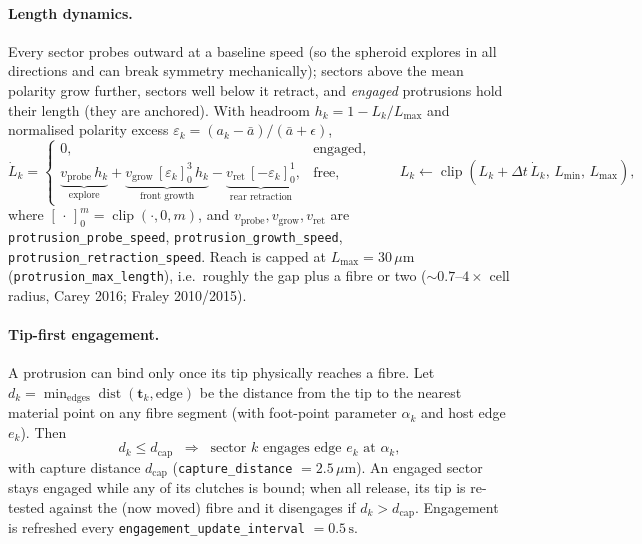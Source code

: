 \documentclass[11pt]{article}
\newcommand{\dt}{\Delta t}
\newcommand{\umt}{\mu\text{m}}            %
\newcommand{\um}{\,\umt}
\newcommand{\code}[1]{\texttt{\small #1}}
\begin{document}
\paragraph{Length dynamics.} Every sector probes outward at a baseline speed (so the spheroid
explores in all directions and can break symmetry mechanically); sectors above the mean polarity
grow further, sectors well below it retract, and \emph{engaged} protrusions hold their length
(they are anchored). With headroom $h_k = 1 - L_k/L_{\max}$ and normalised polarity excess
$\varepsilon_k = (a_k-\bar a)/(\bar a+\epsilon)$,
\begin{equation}
  \dot L_k =
  \begin{cases}
    0, & \text{engaged},\\[3pt]
    \underbrace{v_{\text{probe}}\,h_k}_{\text{explore}}
    + \underbrace{v_{\text{grow}}\,[\varepsilon_k]_0^{3}\,h_k}_{\text{front growth}}
    - \underbrace{v_{\text{ret}}\,[-\varepsilon_k]_0^{1}}_{\text{rear retraction}}, & \text{free},
  \end{cases}
  \qquad
  L_k \leftarrow \operatorname{clip}(L_k+\dt\,\dot L_k,\,L_{\min},\,L_{\max}),
  \label{eq:length}
\end{equation}
where $[\,\cdot\,]_0^{m}=\operatorname{clip}(\cdot,0,m)$, and
$v_{\text{probe}},v_{\text{grow}},v_{\text{ret}}$ are \code{protrusion\_probe\_speed},
\code{protrusion\_growth\_speed}, \code{protrusion\_retraction\_speed}. Reach is capped at
$L_{\max}=30\um$ (\code{protrusion\_max\_length}), i.e.\ roughly the gap plus a fibre or two
($\sim\!0.7$--$4\times$ cell radius, Carey 2016; Fraley 2010/2015).

\paragraph{Tip-first engagement.} A protrusion can bind only once its tip physically reaches a
fibre. Let $d_k=\min_{\text{edges}}\operatorname{dist}(\mathbf t_k,\text{edge})$ be the distance
from the tip to the nearest material point on any fibre segment (with foot-point parameter
$\alpha_k$ and host edge $e_k$). Then
\begin{equation}
  d_k \le d_{\text{cap}}
  \;\;\Longrightarrow\;\;
  \text{sector $k$ engages edge $e_k$ at $\alpha_k$},
  \label{eq:engage}
\end{equation}
with capture distance $d_{\text{cap}}$ (\code{capture\_distance} $=2.5\um$). An engaged sector
stays engaged while any of its clutches is bound; when all release, its tip is re-tested against
the (now moved) fibre and it disengages if $d_k>d_{\text{cap}}$. Engagement is refreshed every
\code{engagement\_update\_interval} $=0.5\,\text{s}$.
\end{document}
